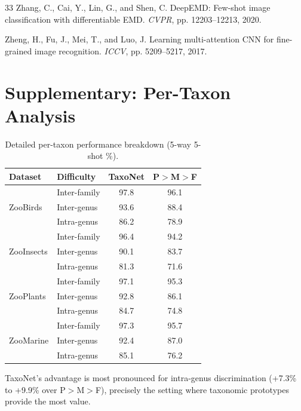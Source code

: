 \documentclass[11pt,a4paper]{article}
\begin{document}
\begin{thebibliography}{33}
Zhang, C., Cai, Y., Lin, G., and Shen, C.
\newblock DeepEMD: Few-shot image classification with differentiable EMD.
\newblock \emph{CVPR}, pp. 12203--12213, 2020.

Zheng, H., Fu, J., Mei, T., and Luo, J.
\newblock Learning multi-attention CNN for fine-grained image recognition.
\newblock \emph{ICCV}, pp. 5209--5217, 2017.

\end{thebibliography}

\appendix
\section{Supplementary: Per-Taxon Analysis}
\label{app:per_taxon}

\begin{table}[H]
\centering
\caption{Detailed per-taxon performance breakdown (5-way 5-shot \%).}
\label{tab:per_taxon}
\begin{tabular}{llcc}
\toprule
\textbf{Dataset} & \textbf{Difficulty} & \textbf{TaxoNet} &
  \textbf{P$>$M$>$F} \\
\midrule
\multirow{3}{*}{ZooBirds}
  & Inter-family & 97.8 & 96.1 \\
  & Inter-genus & 93.6 & 88.4 \\
  & Intra-genus & 86.2 & 78.9 \\
\midrule
\multirow{3}{*}{ZooInsects}
  & Inter-family & 96.4 & 94.2 \\
  & Inter-genus & 90.1 & 83.7 \\
  & Intra-genus & 81.3 & 71.6 \\
\midrule
\multirow{3}{*}{ZooPlants}
  & Inter-family & 97.1 & 95.3 \\
  & Inter-genus & 92.8 & 86.1 \\
  & Intra-genus & 84.7 & 74.8 \\
\midrule
\multirow{3}{*}{ZooMarine}
  & Inter-family & 97.3 & 95.7 \\
  & Inter-genus & 92.4 & 87.0 \\
  & Intra-genus & 85.1 & 76.2 \\
\bottomrule
\end{tabular}
\end{table}

TaxoNet's advantage is most pronounced for intra-genus discrimination
(+7.3\% to +9.9\% over P$>$M$>$F), precisely the setting where
taxonomic prototypes provide the most value.
\end{document}
